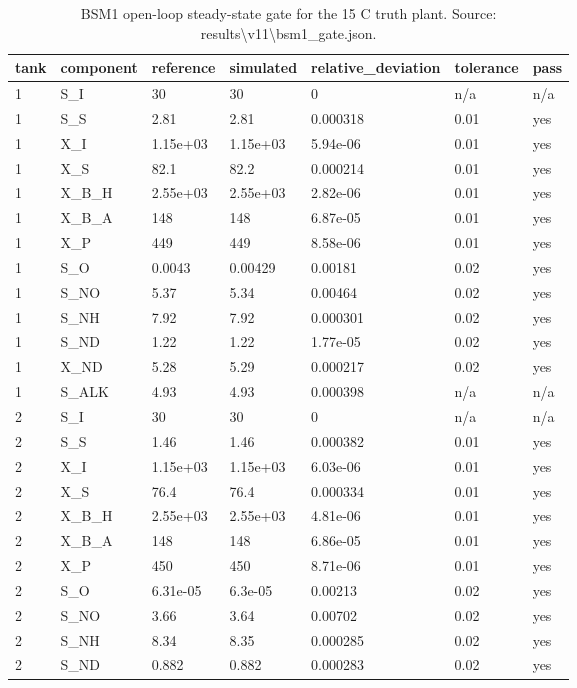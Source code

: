 \begin{table}[t]
\centering
\caption{BSM1 open-loop steady-state gate for the 15 C truth plant. Source: results\textbackslash{}v11\textbackslash{}bsm1\_gate.json.}
\label{tab:si-bsm1-gate}
\footnotesize
\begin{tabular}{lllllll}
\toprule
tank & component & reference & simulated & relative\_deviation & tolerance & pass \\
\midrule
1 & S\_I & 30 & 30 & 0 & n/a & n/a \\
1 & S\_S & 2.81 & 2.81 & 0.000318 & 0.01 & yes \\
1 & X\_I & 1.15e+03 & 1.15e+03 & 5.94e-06 & 0.01 & yes \\
1 & X\_S & 82.1 & 82.2 & 0.000214 & 0.01 & yes \\
1 & X\_B\_H & 2.55e+03 & 2.55e+03 & 2.82e-06 & 0.01 & yes \\
1 & X\_B\_A & 148 & 148 & 6.87e-05 & 0.01 & yes \\
1 & X\_P & 449 & 449 & 8.58e-06 & 0.01 & yes \\
1 & S\_O & 0.0043 & 0.00429 & 0.00181 & 0.02 & yes \\
1 & S\_NO & 5.37 & 5.34 & 0.00464 & 0.02 & yes \\
1 & S\_NH & 7.92 & 7.92 & 0.000301 & 0.02 & yes \\
1 & S\_ND & 1.22 & 1.22 & 1.77e-05 & 0.02 & yes \\
1 & X\_ND & 5.28 & 5.29 & 0.000217 & 0.02 & yes \\
1 & S\_ALK & 4.93 & 4.93 & 0.000398 & n/a & n/a \\
2 & S\_I & 30 & 30 & 0 & n/a & n/a \\
2 & S\_S & 1.46 & 1.46 & 0.000382 & 0.01 & yes \\
2 & X\_I & 1.15e+03 & 1.15e+03 & 6.03e-06 & 0.01 & yes \\
2 & X\_S & 76.4 & 76.4 & 0.000334 & 0.01 & yes \\
2 & X\_B\_H & 2.55e+03 & 2.55e+03 & 4.81e-06 & 0.01 & yes \\
2 & X\_B\_A & 148 & 148 & 6.86e-05 & 0.01 & yes \\
2 & X\_P & 450 & 450 & 8.71e-06 & 0.01 & yes \\
2 & S\_O & 6.31e-05 & 6.3e-05 & 0.00213 & 0.02 & yes \\
2 & S\_NO & 3.66 & 3.64 & 0.00702 & 0.02 & yes \\
2 & S\_NH & 8.34 & 8.35 & 0.000285 & 0.02 & yes \\
2 & S\_ND & 0.882 & 0.882 & 0.000283 & 0.02 & yes \\

\end{tabular}
\end{table}
